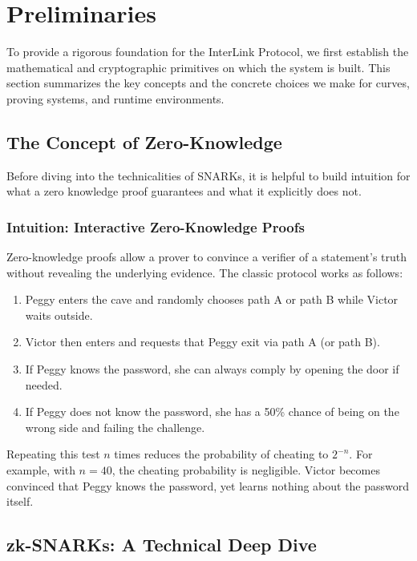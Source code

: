 \documentclass[11pt,a4paper]{article}
\begin{document}
\section{Preliminaries}
\label{sec:prelim}

To provide a rigorous foundation for the InterLink Protocol, we first establish the mathematical and cryptographic primitives on which the system is built. This section summarizes the key concepts and the concrete choices we make for curves, proving systems, and runtime environments.

\subsection{The Concept of Zero-Knowledge}
Before diving into the technicalities of SNARKs, it is helpful to build intuition for what a zero knowledge proof guarantees and what it explicitly does not.

\subsubsection{Intuition: Interactive Zero-Knowledge Proofs}

Zero-knowledge proofs allow a prover to convince a verifier of a statement's truth without revealing the underlying evidence. The classic protocol works as follows:
\begin{enumerate}
    \item Peggy enters the cave and randomly chooses path A or path B while Victor waits outside.
    \item Victor then enters and requests that Peggy exit via path A (or path B).
    \item If Peggy knows the password, she can always comply by opening the door if needed.
    \item If Peggy does not know the password, she has a 50\% chance of being on the wrong side and failing the challenge.
\end{enumerate}

Repeating this test $n$ times reduces the probability of cheating to $2^{-n}$. For example, with $n=40$, the cheating probability is negligible. Victor becomes convinced that Peggy knows the password, yet learns nothing about the password itself.

\subsection{zk-SNARKs: A Technical Deep Dive}
\end{document}
